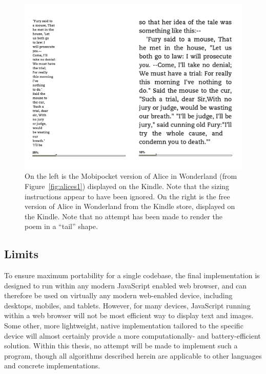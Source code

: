 \begin{figure}
\includegraphics[width=\textwidth]{gfx/alices2}
\vspace{-0.2in}
\caption[Same document displayed on the Kindle]{On the left is the Mobipocket version of Alice in Wonderland (from Figure~\ref{fig:alices1}) displayed on the Kindle. Note that the sizing instructions appear to have been ignored. On the right is the free version of Alice in Wonderland from the Kindle store, displayed on the Kindle. Note that no attempt has been made to render the poem in a ``tail'' shape.}
\label{fig:alices2}
\end{figure}




\subsection{Limits}

To ensure maximum portability for a single codebase, the final implementation is designed to run within any modern JavaScript enabled web browser, and can therefore be used on virtually any modern web-enabled device, including desktops, mobiles, and tablets. However, for many devices, JavaScript running within a web browser will not be most efficient way to display text and images. Some other, more lightweight, native implementation tailored to the specific device will almost certainly provide a more computationally- and bat\-tery-ef\-fi\-cient solution. Within this thesis, no attempt will be made to implement such a program, though all algorithms described herein are applicable to other languages and concrete implementations.

